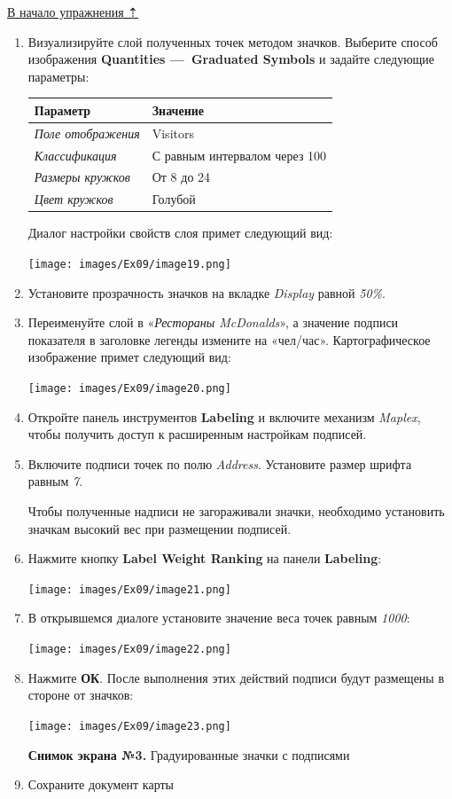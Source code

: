 \documentclass[12pt,]{book}
\begin{document}
\protect\hyperlink{geocoding}{В начало упражнения ⇡}

\begin{enumerate}
\def\labelenumi{\arabic{enumi}.}
\item
  Визуализируйте слой полученных точек методом значков. Выберите способ изображения \textbf{Quantities ---~Graduated Symbols} и задайте следующие параметры:

  \begin{longtable}[]{@{}ll@{}}
  \toprule
  Параметр & Значение\tabularnewline
  \midrule
  \endhead
  \emph{Поле отображения} & Visitors\tabularnewline
  \emph{Классификация} & С равным интервалом через 100\tabularnewline
  \emph{Размеры кружков} & От 8 до 24\tabularnewline
  \emph{Цвет кружков} & Голубой\tabularnewline
  \bottomrule
  \end{longtable}

  Диалог настройки свойств слоя примет следующий вид:

  \texttt{[image: images/Ex09/image19.png]}
\item
  Установите прозрачность значков на вкладке \emph{Display} равной \emph{50\%}.
\item
  Переименуйте слой в «\emph{Рестораны McDonalds}», а значение подписи показателя в заголовке легенды измените на «чел/час». Картографическое изображение примет следующий вид:

  \texttt{[image: images/Ex09/image20.png]}
\item
  Откройте панель инструментов \textbf{Labeling} и включите механизм \emph{Maplex}, чтобы получить доступ к расширенным настройкам подписей.
\item
  Включите подписи точек по полю \emph{Address}. Установите размер шрифта равным \emph{7}.

  Чтобы полученные надписи не загораживали значки, необходимо установить значкам высокий вес при размещении подписей.
\item
  Нажмите кнопку \textbf{Label Weight Ranking} на панели \textbf{Labeling}:

  \texttt{[image: images/Ex09/image21.png]}
\item
  В открывшемся диалоге установите значение веса точек равным \emph{1000}:

  \texttt{[image: images/Ex09/image22.png]}
\item
  Нажмите \textbf{ОК}. После выполнения этих действий подписи будут размещены в стороне от значков:

  \texttt{[image: images/Ex09/image23.png]}

  \textbf{Снимок экрана №3.} Градуированные значки с подписями
\item
  Сохраните документ карты
\end{enumerate}
\end{document}
